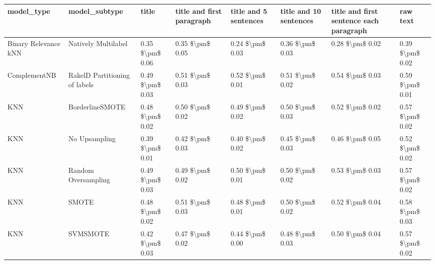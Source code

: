 \begin{tabular}{llllllll}
\toprule
                     model\_type &                 model\_subtype &           title & title and first paragraph & title and 5 sentences & title and 10 sentences & title and first sentence each paragraph &            raw text \\
\midrule
           Binary Relevance kNN &           Natively Multilabel & 0.35 \$\textbackslash pm\$ 0.06 &           0.35 \$\textbackslash pm\$ 0.05 &       0.24 \$\textbackslash pm\$ 0.03 &        0.36 \$\textbackslash pm\$ 0.03 &                         0.28 \$\textbackslash pm\$ 0.02 &     0.39 \$\textbackslash pm\$ 0.02 \\
                   ComplementNB & RakelD Partitioning of labels & 0.49 \$\textbackslash pm\$ 0.03 &           0.51 \$\textbackslash pm\$ 0.03 &       0.52 \$\textbackslash pm\$ 0.01 &        0.51 \$\textbackslash pm\$ 0.02 &                         0.54 \$\textbackslash pm\$ 0.03 &     0.59 \$\textbackslash pm\$ 0.01 \\
                            KNN &               BorderlineSMOTE & 0.48 \$\textbackslash pm\$ 0.02 &           0.50 \$\textbackslash pm\$ 0.02 &       0.49 \$\textbackslash pm\$ 0.02 &        0.50 \$\textbackslash pm\$ 0.03 &                         0.52 \$\textbackslash pm\$ 0.02 &     0.57 \$\textbackslash pm\$ 0.02 \\
                            KNN &                 No Upsampling & 0.39 \$\textbackslash pm\$ 0.01 &           0.42 \$\textbackslash pm\$ 0.03 &       0.40 \$\textbackslash pm\$ 0.02 &        0.45 \$\textbackslash pm\$ 0.03 &                         0.46 \$\textbackslash pm\$ 0.05 &     0.52 \$\textbackslash pm\$ 0.02 \\
                            KNN &           Random Oversampling & 0.49 \$\textbackslash pm\$ 0.03 &           0.49 \$\textbackslash pm\$ 0.02 &       0.50 \$\textbackslash pm\$ 0.01 &        0.50 \$\textbackslash pm\$ 0.02 &                         0.53 \$\textbackslash pm\$ 0.03 &     0.57 \$\textbackslash pm\$ 0.02 \\
                            KNN &                         SMOTE & 0.48 \$\textbackslash pm\$ 0.02 &           0.51 \$\textbackslash pm\$ 0.03 &       0.48 \$\textbackslash pm\$ 0.01 &        0.50 \$\textbackslash pm\$ 0.02 &                         0.52 \$\textbackslash pm\$ 0.04 &     0.58 \$\textbackslash pm\$ 0.03 \\
                            KNN &                      SVMSMOTE & 0.42 \$\textbackslash pm\$ 0.03 &           0.47 \$\textbackslash pm\$ 0.02 &       0.44 \$\textbackslash pm\$ 0.00 &        0.48 \$\textbackslash pm\$ 0.03 &                         0.50 \$\textbackslash pm\$ 0.04 &     0.57 \$\textbackslash pm\$ 0.02 \\

\end{tabular}
